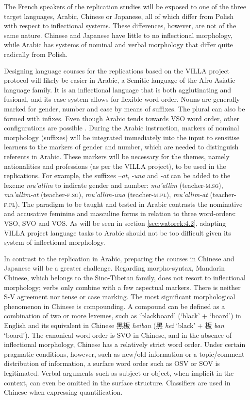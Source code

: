 \documentclass[output=paper,colorlinks,citecolor=brown,modfonts,nonflat]{../langscibook}
\begin{document}
The French speakers of the replication studies will be exposed to one of the three target languages, Arabic, Chinese or Japanese, all of which differ from Polish with respect to inflectional systems. These differences, however, are not of the same nature. Chinese and Japanese have little to no inflectional morphology, while Arabic has systems of nominal and verbal morphology that differ quite radically from Polish.

Designing language courses for the replications based on the VILLA project protocol will likely be easier in Arabic, a Semitic language of the Afro-Asiatic language family. It is an inflectional language that is both agglutinating and fusional, and its case system allows for flexible word order.  Nouns are generally marked for gender, number and case by means of suffixes. The plural can also be formed with infixes. Even though Arabic tends towards VSO word order, other configurations are possible \citep{Ryding2005}. During the Arabic instruction, markers of nominal morphology (suffixes) will be integrated immediately into the input to sensitise learners to the markers of gender and number, which are needed to distinguish referents in Arabic. These markers will be necessary for the themes, namely nationalities and professions (as per the VILLA project), to be used in the replications. For example, the suffixes –\textit{at}, \textit{{}-ūna} and \textit{{}-āt} can be added to the lexeme \textit{mu’allim} to indicate gender and number: \textit{mu’allim} (teacher-\textsc{m.sg}), \textit{mu’allim-at} (teacher-\textsc{f.sg}), \textit{mu’allim-ūna} (teacher-\textsc{m.pl}), \textit{mu’allim-āt} (teacher-\textsc{f.pl}). The paradigm to be taught and tested in Arabic contrasts the nominative and accusative feminine and masculine forms in relation to three word-orders: VSO, SVO and VOS. As will be seen in section \ref{sec:watorek:4.2}, adapting VILLA project language tasks to Arabic should not be too difficult given its system of inflectional morphology.

In contrast to the replication in Arabic, preparing the courses in Chinese and Japanese will be a greater challenge. Regarding morpho-syntax, Mandarin Chinese, which belongs to the Sino-Tibetan family, does not resort to inflectional morphology; verbs only combine with a few aspectual markers. There is neither S-V agreement nor tense or case marking. The most significant morphological phenomenon in Chinese is compounding. A compound can be defined as a combination of two or more lexemes, such as ‘blackboard’ (‘black’ + ‘board’) in English and its equivalent in Chinese {\cjkfont 黑板} \textit{heiban} ({\cjkfont 黑} \textit{hei} ‘black’ + {\cjkfont 板} \textit{ban} ‘board’). The canonical word order is SVO in Chinese, and in the absence of inflectional morphology, Chinese has a relatively strict word order. Under certain pragmatic conditions, however, such as new/old information or a topic/comment distribution of information, a surface word order such as OSV or SOV is legitimated. Verbal arguments such as subject or object, when implicit in the context, can even be omitted in the surface structure. Classifiers are used in Chinese when expressing quantification.
\end{document}
